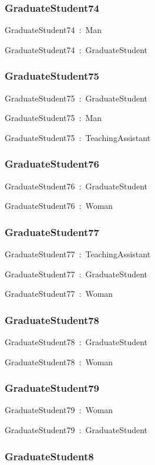\documentclass{article}
\begin{document}
\subsubsection*{GraduateStudent74}

GraduateStudent74~:~Man

GraduateStudent74~:~GraduateStudent

\subsubsection*{GraduateStudent75}

GraduateStudent75~:~GraduateStudent

GraduateStudent75~:~Man

GraduateStudent75~:~TeachingAssistant

\subsubsection*{GraduateStudent76}

GraduateStudent76~:~GraduateStudent

GraduateStudent76~:~Woman

\subsubsection*{GraduateStudent77}

GraduateStudent77~:~TeachingAssistant

GraduateStudent77~:~GraduateStudent

GraduateStudent77~:~Woman

\subsubsection*{GraduateStudent78}

GraduateStudent78~:~GraduateStudent

GraduateStudent78~:~Woman

\subsubsection*{GraduateStudent79}

GraduateStudent79~:~Woman

GraduateStudent79~:~GraduateStudent

\subsubsection*{GraduateStudent8}
\end{document}
